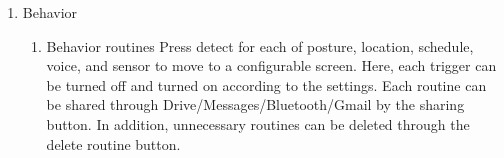\begin{enumerate}[label=\arabic*.]
    \item {\large{Behavior}}
          \begin{enumerate}[label*={\arabic*.},ref=\theenumi.\arabic*]
              \setlength{\itemindent}{0.5cm}
              \item Behavior routines
                    Press detect for each of posture, location, schedule, voice, and sensor to move to a configurable screen. Here, each trigger can be turned off and turned on according to the settings. Each routine can be shared through Drive/Messages/Bluetooth/Gmail by the sharing button. In addition, unnecessary routines can be deleted through the delete routine button.\\\\


\end{enumerate}
\end{enumerate}
